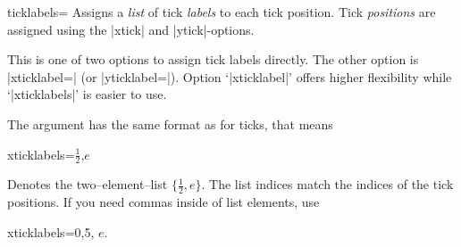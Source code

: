 \begin{pgfplotsxykey}{\x ticklabels=}
Assigns a \emph{list} of tick \emph{labels} to each tick position. Tick \emph{positions} are assigned using the |xtick| and |ytick|-options.

This is one of two options to assign tick labels directly. The other option is |xticklabel=| (or |yticklabel=|).
Option `|xticklabel|' offers higher flexibility while `|xticklabels|' is easier to use.

The argument  has the same format as for ticks, that means
\begin{codeexample}
xticklabels={$\frac{1}{2}$,$e$}
\end{codeexample}
Denotes the two--element--list $\{\frac 12, e\}$. The list indices match the indices of the tick positions. If you need commas inside of list elements, use 
\begin{codeexample}
xticklabels={{0,5}, $e$}.
\end{codeexample}


\begin{codeexample}[]
\end{codeexample}
\end{pgfplotsxykey}


